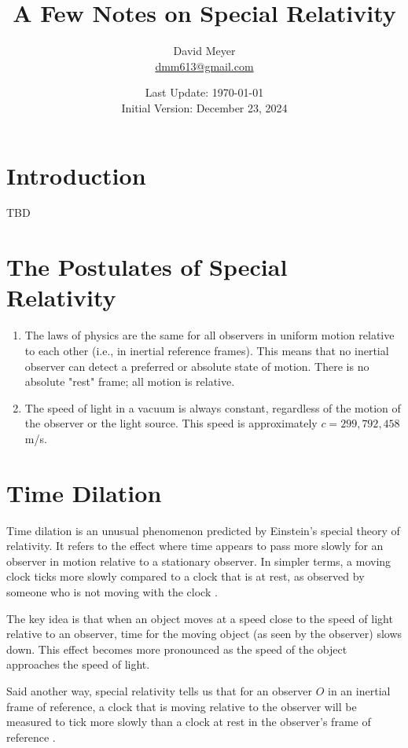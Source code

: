 \documentclass{article}
\title{A Few Notes on Special Relativity}
\author{David Meyer \\ 
	{\small \vspace{-2.75mm} \href{mailto:dmm613@gmail.com}{dmm613@gmail.com}}}
\date{Last Update: \today \\
	{\small \vspace{1.00mm} Initial Version: December 23, 2024}}
\theoremstyle{definition}
\begin{document}
\maketitle
%
%
%
\section{Introduction}
\label{section:introduction}
TBD

\section{The Postulates of Special Relativity}
\label{section:postulates}

\begin{enumerate} 

\item The laws of physics are the same for all observers in
uniform motion relative to each other (i.e., in inertial
reference frames).  This means that no inertial observer can
detect a preferred or absolute state of motion. There is no
absolute "rest" frame; all motion is relative.

\item The speed of light in a vacuum is always constant,
regardless of the motion of the observer or the light
source. This speed is approximately $c=299,792,458$ m/s.
\end{enumerate}

\section{Time Dilation}
\label{section:timedialation}
Time dilation is an unusual phenomenon predicted by Einstein's
special theory of relativity.  It refers to the effect where time
appears to pass more slowly for an observer in motion relative to
a stationary observer. In simpler terms, a moving clock ticks
more slowly compared to a clock that is at rest, as observed by
someone who is not moving with the clock
\cite{physics:spacetime_hughes}.

\bigskip
\noindent
The key idea is that when an object moves at a speed close to the
speed of light relative to an observer, time for the moving
object (as seen by the observer) slows down. This effect becomes
more pronounced as the speed of the object approaches the speed
of light.

\bigskip
\noindent
Said another way, special relativity tells us that for an
observer $O$ in an inertial frame of reference, a clock that is
moving relative to the observer will be measured to tick more
slowly than a clock at rest in the observer's frame of reference
\cite{wikipedia:time_dilation}.
\end{document}
